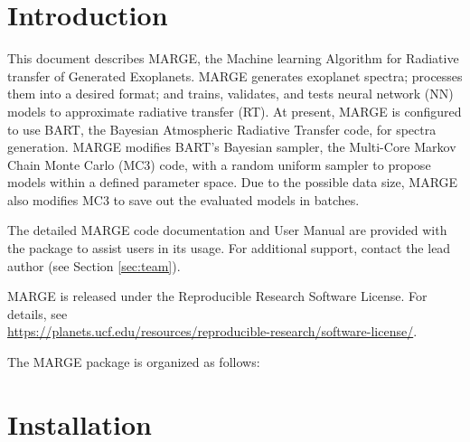 \documentclass[letterpaper, 12pt]{article}
\begin{document}
\section{Introduction}
\label{sec:theory}

\noindent This document describes MARGE, the Machine learning Algorithm for Radiative 
transfer of Generated Exoplanets.  MARGE generates exoplanet spectra; processes 
them into a desired format; and trains, validates, and tests neural network (NN)
models to approximate radiative transfer (RT).  At present, MARGE is configured 
to use BART, the Bayesian Atmospheric Radiative Transfer code, for spectra 
generation.  MARGE modifies BART's Bayesian sampler, the Multi-Core Markov Chain
Monte Carlo (MC3) code, with a random uniform sampler to propose models within a
defined parameter space.  Due to the possible data size, MARGE also modifies MC3
to save out the evaluated models in batches.

The detailed MARGE code documentation and User Manual are provided 
with the package to assist users in its usage. For additional support, contact 
the lead author (see Section \ref{sec:team}).

MARGE is released under the Reproducible Research Software License.  
For details, see \\
\href{https://planets.ucf.edu/resources/reproducible-research/software-license/}{https://planets.ucf.edu/resources/reproducible-research/software-license/}.
\newline

\noindent The MARGE package is organized as follows: \newline
\noindent{}
\vspace{0.7cm}

\section{Installation}
\label{sec:installation}
\end{document}
